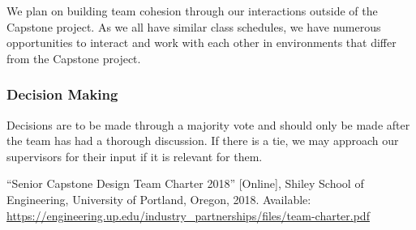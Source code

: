 \documentclass{article}
\begin{document}
We plan on building team cohesion through our interactions outside of the
Capstone project. As we all have similar class schedules, we have numerous
opportunities to interact and work with each other in environments that differ
from the Capstone project. 

\subsubsection*{Decision Making} 

Decisions are to be made through a majority vote and should only be made after
the team has had a thorough discussion. If there is a tie, we may approach our
supervisors for their input if it is relevant for them.

\newpage{}

\begin{thebibliography}{1}
   ``Senior Capstone Design Team Charter 2018'' [Online], Shiley
  School of Engineering, University of Portland, Oregon, 2018. Available:
  \url{https://engineering.up.edu/industry_partnerships/files/team-charter.pdf}
\end{thebibliography}
\end{document}
